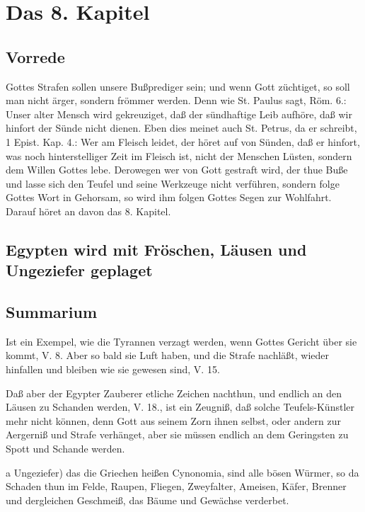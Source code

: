 \chapter{Das 8. Kapitel}

\section{Vorrede}

Gottes Strafen sollen unsere Bußprediger sein; und wenn Gott züchtiget, so soll man nicht ärger, sondern frömmer werden. Denn wie St. Paulus sagt, Röm. 6.: Unser alter Mensch wird gekreuziget, daß der sündhaftige Leib aufhöre, daß wir hinfort der Sünde nicht dienen. Eben dies meinet auch St. Petrus, da er schreibt, 1 Epist. Kap. 4.: Wer am Fleisch leidet, der höret auf von Sünden, daß er hinfort, was noch hinterstelliger Zeit im Fleisch ist, nicht der Menschen Lüsten, sondern dem Willen Gottes lebe. Derowegen wer von Gott gestraft wird, der thue Buße und lasse sich den Teufel und seine Werkzeuge nicht verführen, sondern folge Gottes Wort in Gehorsam, so wird ihm folgen Gottes Segen zur Wohlfahrt. Darauf höret an davon das 8. Kapitel.

\section{Egypten wird mit Fröschen, Läusen und Ungeziefer geplaget}

\section{Summarium}

Ist ein Exempel, wie die Tyrannen verzagt werden, wenn Gottes Gericht über sie kommt, V. 8. Aber so bald sie Luft haben, und die Strafe nachläßt, wieder hinfallen und bleiben wie sie gewesen sind, V. 15.

Daß aber der Egypter Zauberer etliche Zeichen nachthun, und endlich an den Läusen zu Schanden werden, V. 18., ist ein Zeugniß, daß solche Teufels-Künstler mehr nicht können, denn Gott aus seinem Zorn ihnen selbst, oder andern zur Aergerniß und Strafe verhänget, aber sie
müssen endlich an dem Geringsten zu Spott und Schande werden.

a Ungeziefer) das die Griechen heißen Cynonomia, sind alle bösen Würmer, so da Schaden thun im Felde, Raupen, Fliegen, Zweyfalter, Ameisen, Käfer, Brenner und dergleichen Geschmeiß, das Bäume und Gewächse verderbet.

